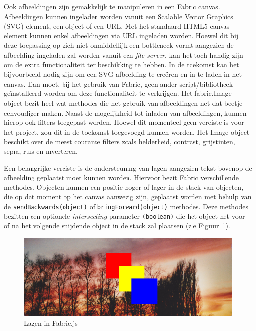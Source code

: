 Ook afbeeldingen zijn gemakkelijk te manipuleren in een Fabric canvas. Afbeeldingen kunnen ingeladen worden vanuit een Scalable Vector Graphics (SVG) element, een object of een URL. Met het standaard HTML5 canvas element kunnen enkel afbeeldingen via URL ingeladen worden. Hoewel dit bij deze toepassing op zich niet onmiddellijk een bottleneck vormt aangezien de afbeelding ingeladen zal worden vanuit een \textit{file server}, kan het toch handig zijn om de extra functionaliteit ter beschikking te hebben. In de toekomst kan het bijvoorbeeld nodig zijn om een SVG afbeelding te cre\"{e}ren en in te laden in het canvas. Dan moet, bij het gebruik van Fabric, geen ander script/bibliotheek ge\"{i}nstalleerd worden om deze functionaliteit te verkrijgen. Het fabric.Image object bezit heel wat methodes die het gebruik van afbeeldingen net dat beetje eenvoudiger maken. %
Naast de mogelijkheid tot inladen van afbeeldingen, kunnen hierop ook filters toegepast worden. Hoewel dit momenteel geen vereiste is voor het project, zou dit in de toekomst toegevoegd kunnen worden. Het Image object beschikt over de meest courante filters zoals helderheid, contrast, grijstinten, sepia, ruis en inverteren.  

Een belangrijke vereiste is de ondersteuning van lagen aangezien tekst bovenop de afbeelding geplaatst moet kunnen worden. Hiervoor bezit Fabric verschillende methodes. Objecten kunnen een positie hoger of lager in de stack van objecten, die op dat moment op het canvas aanwezig zijn, geplaatst worden met behulp van de \texttt{sendBackwards(object)} of \texttt{bringForward(object)} methodes. Deze methodes bezitten een optionele \textit{intersecting} parameter \texttt{(boolean)} die het object net voor of na het volgende snijdende object in de stack zal plaatsen (zie Figuur~\ref{fig:FabricLayers}). 

\begin{figure}[H]
	\centering
	\includegraphics[width=1\textwidth]{Figuren/FabricLayers.png}
	\caption{Lagen in Fabric.js} %
	\label{fig:FabricLayers}
\end{figure} 

